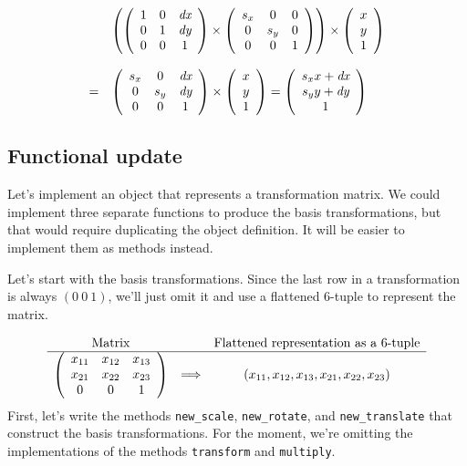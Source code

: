 $$
\begin{array}{cl}
&
\left(
\left(
\begin{array}{ccc}
1 & 0 & \textit{dx}\\
0 & 1 & \textit{dy}\\
0 & 0 & 1
\end{array}
\right)
\times
\left(
\begin{array}{ccc}
s_x & 0 & 0\\
0 & s_y & 0\\
0 & 0 & 1
\end{array}
\right)
\right)
\times
\left(
\begin{array}{c}
x\\
y\\
1
\end{array}
\right)
\\
\\
= &
\left(
\begin{array}{ccc}
s_x & 0 & \textit{dx}\\
0 & s_y & \textit{dy}\\
0 & 0 & 1
\end{array}
\right)
\times
\left(
\begin{array}{c}
x\\
y\\
1
\end{array}
\right)
=
\left(
\begin{array}{c}
s_x x + \textit{dx}\\
s_y y + \textit{dy}\\
1
\end{array}
\right)
\end{array}
$$
%
\subsection{Functional update}

Let's implement an object that represents a transformation matrix.  We could implement three
separate functions to produce the basis transformations, but that would require duplicating the
object definition.  It will be easier to implement them as methods instead.

Let's start with the basis transformations.  Since the last row in a transformation is always $(0\ 0\
1)$, we'll just omit it and use a flattened 6-tuple to represent the matrix.

$$
\begin{array}{ccc}
\hbox{Matrix} & & \hbox{Flattened representation as a 6-tuple}\\
\hline
\left(
\begin{array}{ccc}
x_{11} & x_{12} & x_{13}\\
x_{21} & x_{22} & x_{23}\\
0 & 0 & 1
\end{array}
\right)
&
\Longrightarrow
&
(x_{11}, x_{12}, x_{13}, x_{21}, x_{22}, x_{23})
\end{array}
$$
%
First, let's write the methods \hbox{\lstinline/new_scale/}, \hbox{\lstinline/new_rotate/},
and \hbox{\lstinline/new_translate/} that construct the basis transformations.  For the moment, we're
omitting the implementations of the methods \hbox{\lstinline/transform/} and \hbox{\lstinline/multiply/}.


